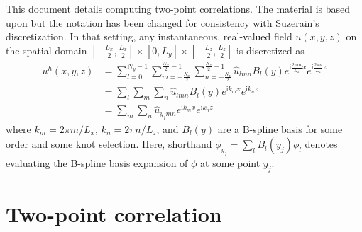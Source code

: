 \documentclass[letterpaper,11pt,nointlimits,reqno]{amsart}
\newcommand{\ii}{\ensuremath{\mathrm{i}}}
\begin{document}
This document details computing two-point correlations.  The material is based
upon \citet[\textsection{}6.4--5]{Pope2000Turbulent} but the notation has been
changed for consistency with Suzerain's discretization.  In that setting, any
instantaneous, real-valued field $u\!\left(x,y,z\right)$ on the spatial domain
$\left[-\frac{L_x}{2},\frac{L_x}{2}\right] \times{} [0,L_y] \times{}
\left[-\frac{L_z}{2},\frac{L_z}{2}\right]$ is discretized as
\begin{align}
  u^h(x,y,z)
&=
  \sum_{l=0}^{N_y - 1}
  \sum_{m=-\frac{N_x}{2}}^{\frac{N_x}{2}-1}
  \sum_{n=-\frac{N_z}{2}}^{\frac{N_z}{2}-1}
  \hat{u}_{l m n}
  B_l\!\left(y\right)
  e^{\ii\frac{2\pi{}m}{L_x}x}
  e^{\ii\frac{2\pi{}n}{L_z}z}
\\&=
  \sum_{l}\sum_{m}\sum_{n}
  \hat{u}_{l m n}B_l\!\left(y\right)e^{\ii k_m x}e^{\ii k_n z}
\\&=
  \sum_{m}\sum_{n}
  \hat{u}_{y_j m n} e^{\ii k_m x}e^{\ii k_n z}
\end{align}
where $k_m = 2\pi{}m/L_x$, $k_n = 2\pi{}n/L_z$, and $B_l\!\left(y\right)$ are a
B-spline basis for some order and some knot selection.  Here, shorthand
$\phi_{y_j} = \sum_{l} B_l\left(y_j\right) \phi_l$ denotes evaluating the
B-spline basis expansion of $\phi$ at some point $y_j$.

\section{Two-point correlation
         \citep[\textsection{}6.3]{Pope2000Turbulent}}
\end{document}
